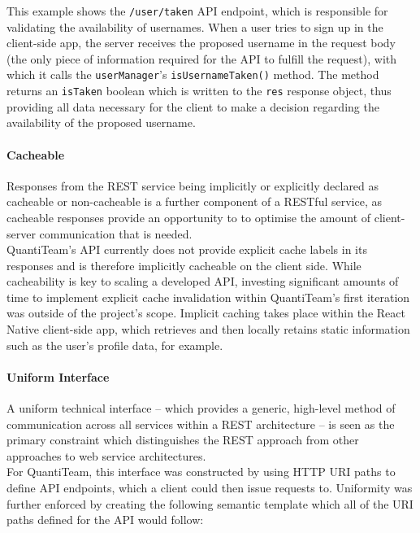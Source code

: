 \documentclass[12pt]{report}
\let\oldparagraph\paragraph
\renewcommand{\paragraph}[1]{\oldparagraph{#1}\mbox{}}
\begin{document}
This example shows the \texttt{/user/taken} API endpoint, which is
responsible for validating the availability of usernames. When a user
tries to sign up in the client-side app, the server receives the
proposed username in the request body (the only piece of information
required for the API to fulfill the request), with which it calls the
\texttt{userManager}'s \texttt{isUsernameTaken()} method. The method
returns an \texttt{isTaken} boolean which is written to the \texttt{res}
response object, thus providing all data necessary for the client to
make a decision regarding the availability of the proposed username.

\paragraph{Cacheable}\label{cacheable}

Responses from the REST service being implicitly or explicitly declared
as cacheable or non-cacheable is a further component of a RESTful
service\cite{1rest}, as
cacheable responses provide an opportunity to to optimise the amount of
client-server communication that is needed.\\
QuantiTeam's API currently does not provide explicit cache labels in its
responses and is therefore implicitly cacheable on the client side.
While cacheability is key to scaling a developed API, investing
significant amounts of time to implement explicit cache invalidation
within QuantiTeam's first iteration was outside of the project's scope.
Implicit caching takes place within the React Native client-side app,
which retrieves and then locally retains static information such as the
user's profile data, for example.

\paragraph{Uniform Interface}\label{uniform-interface}

A uniform technical interface -- which provides a generic, high-level
method of communication across all services within a REST architecture
-- is seen as the primary constraint which distinguishes the REST
approach from other approaches to web service
architectures\cite{1rest}.\\
For QuantiTeam, this interface was constructed by using HTTP URI paths
to define API endpoints, which a client could then issue requests to.
Uniformity was further enforced by creating the following semantic
template which all of the URI paths defined for the API would follow:
\end{document}
